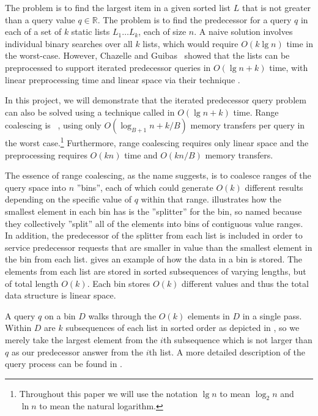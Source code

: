 
The  problem is to find the largest item in a given sorted list $L$
that is not greater than a query value $q \in \mathbb{R}$.  The  
problem is to find the predecessor for a query $q$ in each of a set of $k$ static lists
$L_1 \ldots L_k$, each of size $n$.  A naive solution involves individual binary searches over all
$k$ lists, which would require $O(k \lg n)$ time in the worst-case.  However, Chazelle
and Guibas~\cite{ChazelleGu86a} showed that the lists can be 
preprocessed to support iterated predecessor queries in $O(\lg n + k)$ time, with
linear preprocessing time and linear space via their technique .

In this project, we will demonstrate that the iterated predecessor query problem
can also be solved using a technique called  in $O(\lg n + k)$ time.
Range coalescing is ~\cite{FrigoLePr99}, using only 
$O(\log_{B+1} n + k/B)$ memory transfers per query in the worst case.\footnote{Throughout 
this paper we will use the notation $\lg n$ to mean $\log_2 n$ and $\ln n$ to 
mean the natural logarithm.}  Furthermore, range coalescing requires
only linear space and the preprocessing requires $O(kn)$ time and $O(kn/B)$ memory
transfers.

The essence of range coalescing, as the name suggests, is to coalesce ranges of 
the query space into $n$ ''bins'', each of which could generate $O(k)$ different results
depending on the specific value of $q$ within that range.
 illustrates how the smallest element in each bin has 
is the ''splitter'' for the bin, so named because they collectively ''split'' all
of the elements into bins of contiguous value ranges.  In addition,
the predecessor of the splitter from each list is included in order to
service predecessor requests that are smaller in value than the smallest element
in the bin from each list.   gives an example of how the data
in a bin is stored.  The elements from each list are stored in sorted subsequences of
varying lengths, but of total length $O(k)$. Each bin stores $O(k)$ different 
values and thus the total data structure is linear space.

A query $q$ on a bin $D$ walks through the $O(k)$ elements in $D$ in a single pass.
Within $D$ are $k$ subsequences of each list in sorted order as depicted in 
, so we merely take the
largest element from the $i$th subsequence which is not larger than $q$ as our predecessor
answer from the $i$th list.  A more detailed description of the query process can
be found in .

